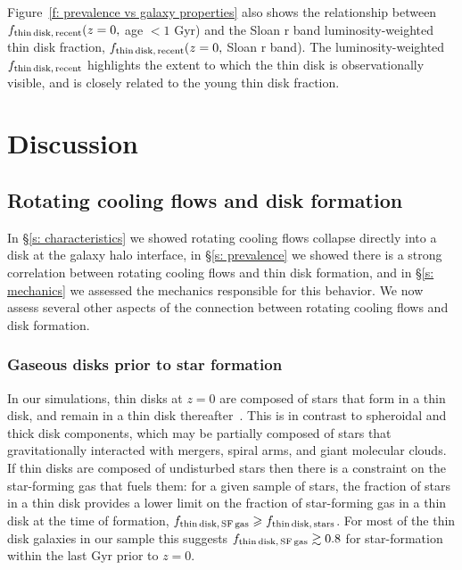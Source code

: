 \documentclass[fleqn,usenatbib]{mnras}
\begin{document}
Figure~\ref{f: prevalence vs galaxy properties} also shows the relationship between $f_{\rm thin\,disk,\,recent}(z=0,$ age $<1$ Gyr) and the Sloan r band luminosity-weighted thin disk fraction, $f_{\rm thin\,disk,\,recent}(z=0,$ Sloan r band).
The luminosity-weighted $f_{\rm thin\,disk,\,recent}$ highlights the extent to which the thin disk is observationally visible, and is closely related to the young thin disk fraction.


\section{Discussion}
\label{s: discussion}

\subsection{Rotating cooling flows and disk formation}
\label{s: disk formation}

In \S\ref{s: characteristics} we showed rotating cooling flows collapse directly into a disk at the galaxy halo interface, in \S\ref{s: prevalence} we showed there is a strong correlation between rotating cooling flows and thin disk formation, and in \S\ref{s: mechanics} we assessed the mechanics responsible for this behavior.
We now assess several other aspects of the connection between rotating cooling flows and disk formation.

\subsubsection{Gaseous disks prior to star formation}
\label{s: disk formation -- condition}

In our simulations, thin disks at $z=0$ are composed of stars that form in a thin disk, and remain in a thin disk thereafter~\citep{Yu2021}.
This is in contrast to spheroidal and thick disk components, which may be partially composed of stars that gravitationally interacted with mergers, spiral arms, and giant molecular clouds.
If thin disks are composed of undisturbed stars then there is a  constraint on the star-forming gas that fuels them:
for a given sample of stars, the fraction of stars in a thin disk provides a lower limit on the fraction of star-forming gas in a thin disk at the time of formation, $f_{\rm thin\,disk,\,SF\,gas} \ge f_{\rm thin\,disk,\,stars}$.
For most of the thin disk galaxies in our sample this suggests $f_{\rm thin\,disk,\,SF\,gas} \gtrsim 0.8$ for star-formation within the last Gyr prior to $z=0$.
\end{document}
